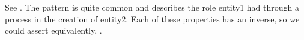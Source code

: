 \documentclass[letterpaper,10pt,english]{sphinxmanual}
\begin{document}
\begin{sphinxVerbatim}[commandchars=\\\{\}]
  
  
  
\end{sphinxVerbatim}

\sphinxAtStartPar
See {\hyperref[\detokenize{locations:table-14}]{}}. The pattern  is quite common and describes the role entity1 had through a process
in
the creation of entity2. Each of these properties has an inverse, so we could assert
equivalently, .
\end{document}
